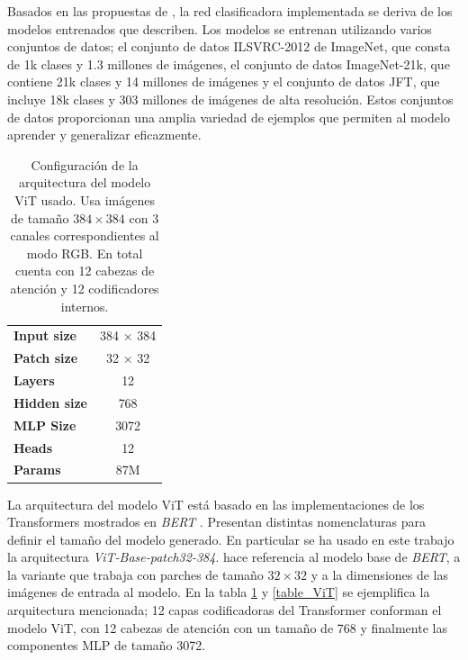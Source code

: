 {Basados en las propuestas de \citeauthor{DBLP:journals/corr/abs-2010-11929}, la red clasificadora
implementada se deriva de los modelos entrenados que describen. Los modelos se entrenan utilizando
varios conjuntos de datos; el conjunto de datos ILSVRC-2012 de ImageNet, que consta de 1k clases y
1.3 millones de imágenes, el conjunto de datos ImageNet-21k, que contiene 21k clases y 14 millones
de imágenes y el conjunto de datos JFT, que incluye 18k clases y 303 millones de imágenes de alta
resolución. Estos conjuntos de datos proporcionan una amplia variedad de ejemplos que permiten al
modelo aprender y generalizar eficazmente.

\begin{table}[!ht]
    \centering
    \begin{tabular}{| l | c |}
     \hline
    \textbf{Input size}  & 384 $\times$ 384 \\
    \textbf{Patch size}  & 32 $\times$ 32 \\
    \textbf{Layers}      & 12  \\
    \textbf{Hidden size} & 768 \\
    \textbf{MLP Size}    & 3072 \\
    \textbf{Heads}       & 12 \\
    \textbf{Params}      & 87M \\
     \hline
    \end{tabular}
    \caption{Configuración de la arquitectura del modelo ViT usado. Usa imágenes de tamaño
             $384 \times 384$ con 3 canales correspondientes al modo RGB. En total cuenta con 12
             cabezas de atención y 12 codificadores internos.}
\label{table_ViTBase}
\end{table}

La arquitectura del modelo ViT está basado en las implementaciones de los Transformers
mostrados en \textit{BERT} \cite{DBLP:journals/corr/abs-1810-04805}. Presentan distintas nomenclaturas
para definir el tamaño del modelo generado. En particular se ha usado en este trabajo la arquitectura
\textit{ViT-Base-patch32-384}.  hace referencia al modelo base de
\textit{BERT},  a la variante que trabaja con parches de tamaño $32 \times 32$ y
 a la dimensiones de las imágenes de entrada al modelo. En la tabla \ref{table_ViTBase}
y \ref{table_ViT}
se ejemplifica la arquitectura mencionada; 12 capas codificadoras del Transformer conforman el modelo
ViT, con 12 cabezas de atención con un tamaño de 768 y finalmente las componentes MLP de tamaño 3072.

}
